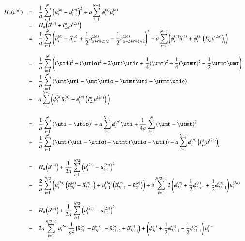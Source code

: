 \documentclass{scrartcl}
\begin{document}
\[\begin{array}{>{\displaystyle}r>{\displaystyle}c>{\displaystyle}l}
H_a(u^{(a)})&=&\frac{1}{a}\sum_{i=1}^N
\left( u_i^{(a)}-u_{i-1}^{(a)}\right) ^2+a\sum_{i=1}^{N-1}\phi_i^{(a)}u_i^{(a)}\\
&=&H_a\left( \tilde{u}^{(a)}+I_{2a}^au^{(2a)}\right) \\

&=&\frac{1}{a}\sum_{i=1}^N\left( \tilde{u}_i^{(a)}-\tilde{u}_{i-1}^{(a)}+\frac{1}{2}u_{(i+i\%2)/2}^{(2a)}-\frac{1}{2}u_{(i-2+i\%2)/2}^{(2a)}\right) ^2+a\sum_{i=1}^{N-1}\left( \phi_i^{(a)}\tilde{u}_i^{(a)}+\phi_i^{(a)}\left( I_{2a}^au^{(2a)}\right)_i\right) \\

&&\\

&=&\frac{1}{a}\sum_{i=1}^N\left((\uti)^2+(\utio)^2-2\uti\utio+\frac{1}{4}(\umt)^2+\frac{1}{4}(\utmt)^2-\frac{1}{2}\utmt\umt\right) \\
&+&\frac{1}{a}\sum_{i=1}^N\left(\umt\uti-\umt\utio-\utmt\uti+\utmt\utio\right)\\
&+&a\sum_{i=1}^{N-1}\left( \phi_i^{(a)}\tilde{u}_i^{(a)}+\phi_i^{(a)}\left( I_{2a}^au^{(2a)}\right)_i\right)\\

&&\\

&=&\frac{1}{a}\sum_{i=1}^N
\left( \uti-\utio\right) ^2+a\sum_{i=1}^{N-1}\phi_i^{(a)}\uti+
\frac{1}{4a}\sum_{i=1}^N\left(\umt-\utmt\right)^2\\

&+&\frac{1}{a}\sum_{i=1}^N \left(\umt\left(\uti-\utio \right) +\utmt\left(\utio-\uti \right)  \right)+a\sum_{i=1}^{N-1}\phi_i^{(a)}\left( I_{2a}^au^{(2a)}\right)_i\\

&&\\

&=&H_a\left(  \tilde{u}^{(a)}\right) + \frac{1}{2a}\sum_{i=1}^{N/2} \left( u_i^{(2a)}-u_{i-1}^{(2a)}\right)^2\\
&+&\frac{2}{a}\sum_{i=1}^{N/2}
\left( u_{i}^{(2a)}\left( \tilde{u}_{2i}^{(a)}-\tilde{u}_{2i-1}^{(a)}\right) 
+u_{i-1}^{(2a)}\left( \tilde{u}_{2i-1}^{(a)}-\tilde{u}_{2i}^{(a)}\right) \right)
+a\sum_{i=1}^{N/2-1}2
\left( \phi_{2i}^{(a)}+\frac{1}{2}\phi_{2i+1}^{(a)}+\frac{1}{2}\phi_{2i-1}^{(a)}\right) u_i^{(2a)} \\

&&\\


&=&H_a\left(  \tilde{u}^{(a)}\right) + \frac{1}{2a}\sum_{i=1}^{N/2} \left( u_i^{(2a)}-u_{i-1}^{(2a)}\right)^2\\
&+&2a\sum_{i=1}^{N/2-1}
u_{i}^{(2a)}\frac{1}{a^2}\left(\tilde{u}_{2i}^{(a)}-\tilde{u}_{2i-1}^{(a)}-\tilde{u}_{2i+2}^{(a)}+\tilde{u}_{2i+1}^{(a)}  \right)
+\left( \phi_{2i}^{(a)}+\frac{1}{2}\phi_{2i+1}^{(a)}+\frac{1}{2}\phi_{2i-1}^{(a)}\right) u_i^{(2a)} \\


\end{array}\]
\end{document}
